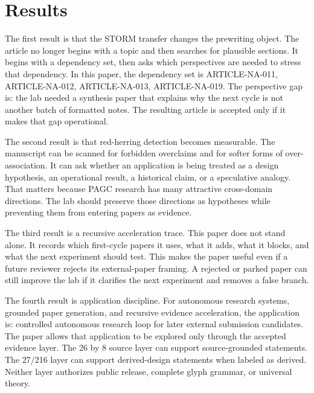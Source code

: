 \documentclass[sigconf,nonacm]{acmart}
\begin{document}
\section{Results}
The first result is that the STORM transfer changes the prewriting object. The
article no longer begins with a topic and then searches for plausible sections.
It begins with a dependency set, then asks which perspectives are needed to
stress that dependency. In this paper, the dependency set is ARTICLE-NA-011, ARTICLE-NA-012, ARTICLE-NA-013, ARTICLE-NA-019. The
perspective gap is: the lab needed a synthesis paper that explains why the next cycle is not another batch of formatted notes. The resulting article is accepted only if it makes
that gap operational.

The second result is that red-herring detection becomes measurable. The
manuscript can be scanned for forbidden overclaims and for softer forms of
over-association. It can ask whether an application is being treated as a design
hypothesis, an operational result, a historical claim, or a speculative analogy.
That matters because PAGC research has many attractive cross-domain directions.
The lab should preserve those directions as hypotheses while preventing them
from entering papers as evidence.

The third result is a recursive acceleration trace. This paper does not stand
alone. It records which first-cycle papers it uses, what it adds, what it blocks,
and what the next experiment should test. This makes the paper useful even if a
future reviewer rejects its external-paper framing. A rejected or parked paper
can still improve the lab if it clarifies the next experiment and removes a
false branch.

The fourth result is application discipline. For autonomous research systems, grounded paper generation, and recursive evidence acceleration, the application is:
controlled autonomous research loop for later external submission candidates. The paper allows that application to be explored only through the
accepted evidence layer. The 26 by 8 source layer can support source-grounded
statements. The 27/216 layer can support derived-design statements when labeled
as derived. Neither layer authorizes public release, complete glyph grammar, or
universal theory.
\end{document}
